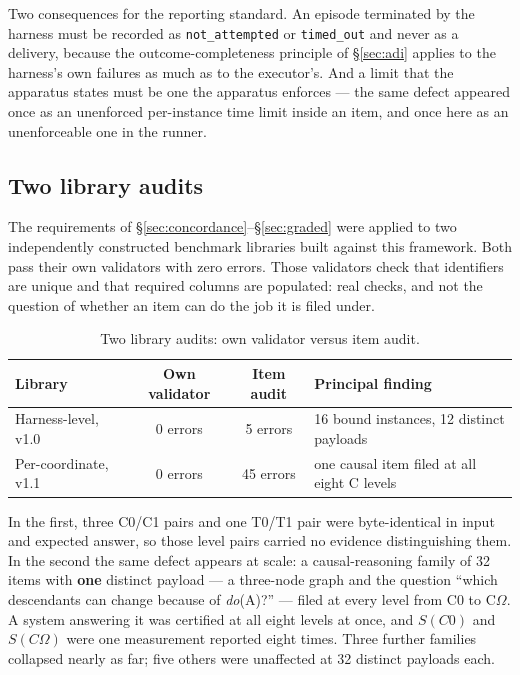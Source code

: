 \documentclass[11pt]{article}
\theoremstyle{definition}
\newcommand{\Om}{\ensuremath{\Omega}}
\begin{document}
Two consequences for the reporting standard. An episode terminated by the harness must be recorded as \texttt{not\_attempted} or \texttt{timed\_out} and never as a delivery, because the outcome-completeness principle of \S\ref{sec:adi} applies to the harness's own failures as much as to the executor's. And a limit that the apparatus states must be one the apparatus enforces --- the same defect appeared once as an unenforced per-instance time limit inside an item, and once here as an unenforceable one in the runner.

\subsection{Two library audits}\label{sec:libraries}

The requirements of \S\ref{sec:concordance}--\S\ref{sec:graded} were applied to two independently constructed benchmark libraries built against this framework. Both pass their own validators with zero errors. Those validators check that identifiers are unique and that required columns are populated: real checks, and not the question of whether an item can do the job it is filed under.

\begin{table}[H]
\centering\small
\begin{tabularx}{\textwidth}{@{}lccY@{}}
\toprule
Library & Own validator & Item audit & Principal finding \\
\midrule
Harness-level, v1.0 & 0 errors & 5 errors & 16 bound instances, 12 distinct payloads \\
Per-coordinate, v1.1 & 0 errors & 45 errors & one causal item filed at all eight C levels \\
\bottomrule
\end{tabularx}
\caption{Two library audits: own validator versus item audit.}
\label{tab:libaudits}
\end{table}

In the first, three C0/C1 pairs and one T0/T1 pair were byte-identical in input and expected answer, so those level pairs carried no evidence distinguishing them. In the second the same defect appears at scale: a causal-reasoning family of 32 items with \textbf{one} distinct payload --- a three-node graph and the question ``which descendants can change because of \emph{do}(A)?'' --- filed at every level from C0 to C\Om{}. A system answering it was certified at all eight levels at once, and $S(C0)$ and $S(C\Om{})$ were one measurement reported eight times. Three further families collapsed nearly as far; five others were unaffected at 32 distinct payloads each.
\end{document}
